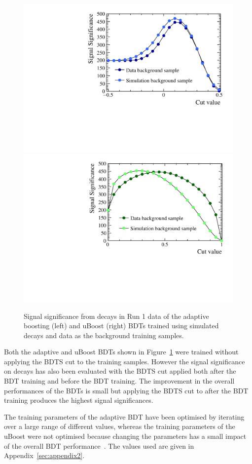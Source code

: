 \begin{figure}[htbp]
    \centering
        \includegraphics[width=0.49 \textwidth]{./Figs/Selection/BDT_data_MC_comp.pdf}
       \includegraphics[width=0.49 \textwidth]{./Figs/Selection/uBoost_data_MC_comp.pdf}
    \caption{Signal significance from \bhh decays in Run 1 data of the adaptive boosting (left) and uBoost (right) BDTs trained using simulated decays and data as the background training samples.}
    \label{fig:SSelBDTs}
\end{figure}

Both the adaptive and uBoost BDTs shown in Figure~\ref{fig:SSelBDTs} were trained without applying the BDTS cut to the training samples. However the signal significance on \bhh decays has also been evaluated with the BDTS cut applied both after the BDT training and before the BDT training. The improvement in the overall performances of the BDTs is small but applying the BDTS cut to \bhh after the BDT training produces the highest signal significances. 

The training parameters of the adaptive BDT have been optimised by iterating over a large range of different values, whereas the training parameters of the uBoost were not optimised because changing the parameters has a small impact of the overall BDT performance~\cite{Stevens:2013dya}. The values used are given in Appendix~\ref{sec:appendix2}. 

